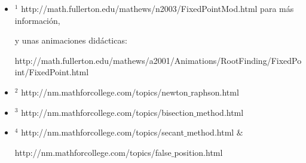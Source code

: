\begin{itemize}
	\item $^1$ http://math.fullerton.edu/mathews/n2003/FixedPointMod.html para más información, 

	y unas animaciones didácticas: 

	http://math.fullerton.edu/mathews/a2001/Animations/RootFinding/FixedPoint/FixedPoint.html
	\item $^2$ http://nm.mathforcollege.com/topics/newton$\_$raphson.html
	\item $^3$ http://nm.mathforcollege.com/topics/bisection$\_$method.html
	\item $^4$ http://nm.mathforcollege.com/topics/secant$\_$method.html $\&$ 

	http://nm.mathforcollege.com/topics/false$\_$position.html
\end{itemize}
